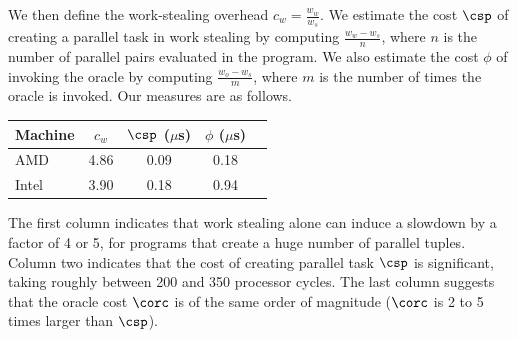 We then define the work-stealing overhead $c_w = \frac{w_w}{w_s}$.
We estimate the cost $\csp$ of creating a parallel task in work stealing
by computing $\frac{w_w - w_s}{n}$, where
$n$ is the number of parallel pairs evaluated in the program.
We also estimate the cost $\phi$ of invoking the oracle  by computing $\frac{w_o - w_s}{m}$,
where $m$ is the number of times the oracle is invoked.
Our measures are as follows.
%
\begin{center}
\begin{tabular}{l | c c c c}
Machine & $c_w$  &  $\csp$ ($\mu$s) & $\phi$ ($\mu$s) \\
\hline
AMD   & 4.86   & 0.09  & 0.18 \\
Intel & 3.90  &  0.18  & 0.94 \\
\end{tabular}
\end{center}

The first column indicates that work stealing alone can induce
a slowdown by a factor of 4 or 5, for programs that create a
huge number of parallel tuples. 
Column two indicates that the cost of creating parallel task $\csp$ 
is significant, taking roughly between 200 and 350 processor cycles. 
The last column suggests that the oracle cost $\corc$
is of the same order of magnitude ($\corc$ is 2 to 5 times larger than $\csp$).


